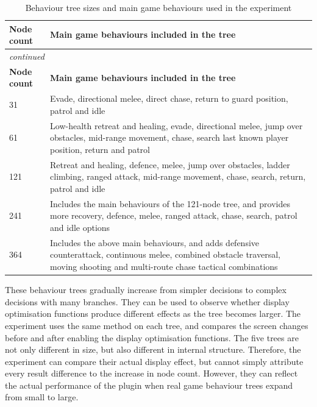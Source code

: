 \begin{center}

\begin{longtable}{@{}p{} p{}@{}}
\caption{Behaviour tree sizes and main game behaviours used in the experiment}\label{tab:experiment-tree-sizes}\\
\toprule
\textbf{Node count} & \textbf{Main game behaviours included in the tree} \\
\midrule
\endfirsthead
\multicolumn{2}{l}{\itshape continued}\\
\toprule
\textbf{Node count} & \textbf{Main game behaviours included in the tree} \\
\midrule
\endhead
31 & Evade, directional melee, direct chase, return to guard position, patrol and idle \\
61 & Low-health retreat and healing, evade, directional melee, jump over obstacles, mid-range movement, chase, search last known player position, return and patrol \\
121 & Retreat and healing, defence, melee, jump over obstacles, ladder climbing, ranged attack, mid-range movement, chase, search, return, patrol and idle \\
241 & Includes the main behaviours of the 121-node tree, and provides more recovery, defence, melee, ranged attack, chase, search, patrol and idle options \\
364 & Includes the above main behaviours, and adds defensive counterattack, continuous melee, combined obstacle traversal, moving shooting and multi-route chase tactical combinations \\
\bottomrule
\end{longtable}
\end{center}

These behaviour trees gradually increase from simpler decisions to complex decisions with many branches. They can be used to observe whether display optimisation functions produce different effects as the tree becomes larger. The experiment uses the same method on each tree, and compares the screen changes before and after enabling the display optimisation functions. The five trees are not only different in size, but also different in internal structure. Therefore, the experiment can compare their actual display effect, but cannot simply attribute every result difference to the increase in node count. However, they can reflect the actual performance of the plugin when real game behaviour trees expand from small to large.


